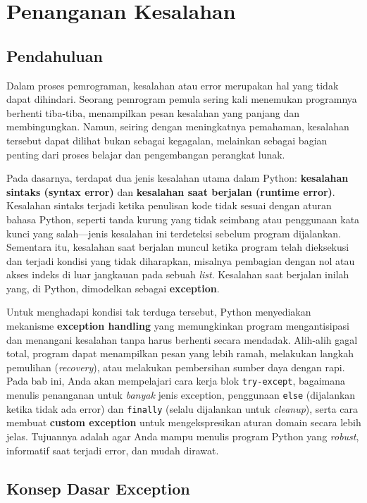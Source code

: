 \chapter{Penanganan Kesalahan}

\section{Pendahuluan}

Dalam proses pemrograman, kesalahan atau error merupakan hal yang tidak dapat dihindari. Seorang pemrogram pemula sering kali menemukan programnya berhenti tiba-tiba, menampilkan pesan kesalahan yang panjang dan membingungkan. Namun, seiring dengan meningkatnya pemahaman, kesalahan tersebut dapat dilihat bukan sebagai kegagalan, melainkan sebagai bagian penting dari proses belajar dan pengembangan perangkat lunak.

Pada dasarnya, terdapat dua jenis kesalahan utama dalam Python: \textbf{kesalahan sintaks (syntax error)} dan \textbf{kesalahan saat berjalan (runtime error)}. Kesalahan sintaks terjadi ketika penulisan kode tidak sesuai dengan aturan bahasa Python, seperti tanda kurung yang tidak seimbang atau penggunaan kata kunci yang salah—jenis kesalahan ini terdeteksi sebelum program dijalankan. Sementara itu, kesalahan saat berjalan muncul ketika program telah dieksekusi dan terjadi kondisi yang tidak diharapkan, misalnya pembagian dengan nol atau akses indeks di luar jangkauan pada sebuah \textit{list}. Kesalahan saat berjalan inilah yang, di Python, dimodelkan sebagai \textbf{exception}.

Untuk menghadapi kondisi tak terduga tersebut, Python menyediakan mekanisme \textbf{exception handling} yang memungkinkan program mengantisipasi dan menangani kesalahan tanpa harus berhenti secara mendadak. Alih-alih gagal total, program dapat menampilkan pesan yang lebih ramah, melakukan langkah pemulihan (\textit{recovery}), atau melakukan pembersihan sumber daya dengan rapi. Pada bab ini, Anda akan mempelajari cara kerja blok \texttt{try-except}, bagaimana menulis penanganan untuk \textit{banyak} jenis exception, penggunaan \texttt{else} (dijalankan ketika tidak ada error) dan \texttt{finally} (selalu dijalankan untuk \textit{cleanup}), serta cara membuat \textbf{custom exception} untuk mengekspresikan aturan domain secara lebih jelas. Tujuannya adalah agar Anda mampu menulis program Python yang \textit{robust}, informatif saat terjadi error, dan mudah dirawat.


\section{Konsep Dasar Exception}


